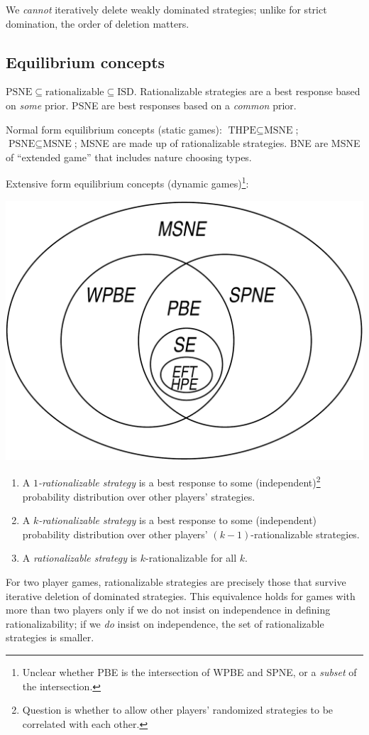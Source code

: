\documentclass[8pt,letterpaper, landscape]{extarticle} %
\begin{document}
\begin{multicols}{3}
\begin{description}
We \textit{cannot} iteratively delete weakly dominated strategies; unlike for strict domination, the order of deletion matters.

\subsection{Equilibrium concepts}
$ \text{PSNE} \subseteq \text{rationalizable} \subseteq \text{ISD} $.
Rationalizable strategies are a best response based on \textit{some} prior. PSNE are best responses based on a \textit{common} prior.

Normal form equilibrium concepts (static games):
$ \text{THPE} \subseteq \text{MSNE} $; $ \text{PSNE} \subseteq \text{MSNE} $;
MSNE are made up of rationalizable strategies. BNE are MSNE of ``extended game'' that includes nature choosing types.

Extensive form equilibrium concepts (dynamic games)\footnote{Unclear whether PBE is the intersection of WPBE and SPNE, or a \textit{subset} of the intersection.}:
\begin{center} \includegraphics[width=.6\linewidth]{images/equil} \end{center}

\begin{enumerate}
\item A \textit{$ 1 $-rationalizable strategy} is a best response to some (independent)\footnote{Question is whether to allow other players' randomized strategies to be correlated with each other.} probability distribution over other players' strategies.
\item A \textit{$ k $-rationalizable strategy} is a best response to some (independent) probability distribution over other players' $ (k-1) $-rationalizable strategies.
\item A \textit{rationalizable strategy} is $ k $-rationalizable for all $ k $.
\end{enumerate}
For two player games, rationalizable strategies are precisely those that survive iterative deletion of dominated strategies. This equivalence holds for games with more than two players only if we do not insist on independence in defining rationalizability; if we \textit{do} insist on independence, the set of rationalizable strategies is smaller.


\end{description}
\end{multicols}
\end{document}
